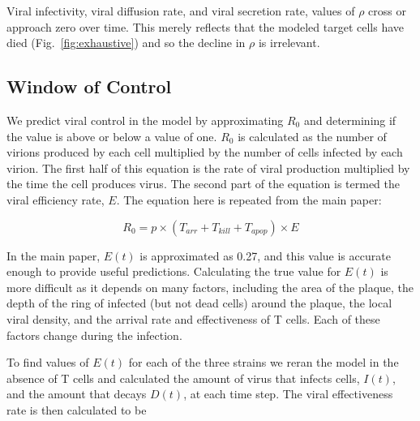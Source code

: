 \documentclass[preprint,10pt,authoryear]{article}
\begin{document}
Viral infectivity, viral diffusion rate, and viral secretion rate, values of $\rho$ cross or approach zero over time.  This merely reflects that the modeled target cells have died (Fig.~\ref{fig:exhaustive}) and so the decline in $\rho$ is irrelevant.


\subsection{Window of Control}

We predict viral control in the model by approximating $R_0$ and determining if the value is above or below a value of one.  $R_0$ is calculated as the number of virions produced by each cell multiplied by the number of cells infected by each virion.  The first half of this equation is the rate of viral production multiplied by the time the cell produces virus.  The second part of the equation is termed the viral efficiency rate, $E$.  The equation here is repeated from the main paper:

\begin{equation}
R_0 = p \times (T_{arr} + T_{kill} + T_{apop}) \times E
\end{equation}

In the main paper, $E(t)$ is approximated as 0.27, and this value is accurate enough to provide useful predictions.  Calculating the true value for $E(t)$ is more difficult as it depends on many factors, including the area of the plaque, the depth of the ring of infected (but not dead cells) around the plaque, the local viral density, and the arrival rate and effectiveness of T cells.  Each of these factors change during the infection. 

To find values of $E(t)$ for each of the three strains we reran the model in the absence of T cells and calculated the amount of virus that infects cells, $I(t)$, and the amount that decays $D(t)$, at each time step.  The viral effectiveness rate is then calculated to be
\end{document}
